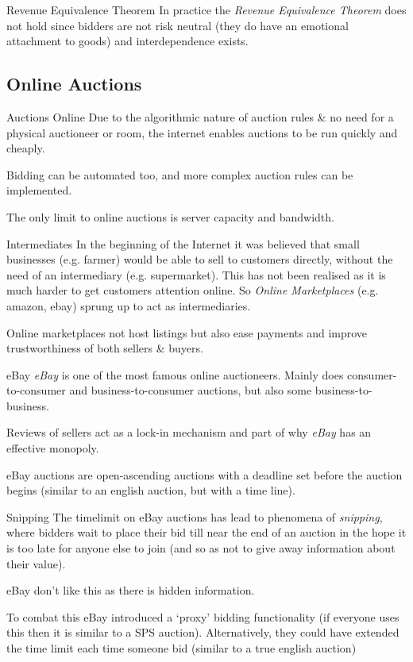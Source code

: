 \documentclass[11pt,a4paper]{article}
\begin{document}
\begin{remark}{Revenue Equivalence Theorem}
  In practice the \textit{Revenue Equivalence Theorem} does not hold since bidders are not risk neutral (they do have an emotional attachment to goods) and interdependence exists.
\end{remark}

\subsection{Online Auctions}

\begin{remark}{Auctions Online}
  Due to the algorithmic nature of auction rules \& no need for a physical auctioneer or room, the internet enables auctions to be run quickly and cheaply.
  \par Bidding can be automated too, and more complex auction rules can be implemented.
  \par The only limit to online auctions is server capacity and bandwidth.
\end{remark}

\begin{remark}{Intermediates}
  In the beginning of the Internet it was believed that small businesses (e.g. farmer) would be able to sell to customers directly, without the need of an intermediary (e.g. supermarket). This has not been realised as it is much harder to get customers attention online. So \textit{Online Marketplaces} (e.g. amazon, ebay) sprung up to act as intermediaries.
  \par Online marketplaces not host listings but also ease payments and improve trustworthiness of both sellers \& buyers.
\end{remark}

\begin{remark}{eBay}
  \textit{eBay} is one of the most famous online auctioneers. Mainly does consumer-to-consumer and business-to-consumer auctions, but also some business-to-business.
  \par Reviews of sellers act as a lock-in mechanism and part of why \textit{eBay} has an effective monopoly.
  \par eBay auctions are open-ascending auctions with a deadline set before the auction begins (similar to an english auction, but with a time line).
\end{remark}

\begin{remark}{Snipping}
  The timelimit on eBay auctions has lead to phenomena of \textit{snipping}, where bidders wait to place their bid till near the end of an auction in the hope it is too late for anyone else to join (and so as not to give away information about their value).
  \par eBay don't like this as there is hidden information.
  \par To combat this eBay introduced a `proxy' bidding functionality (if everyone uses this then it is similar to a SPS auction). Alternatively, they could have extended the time limit each time someone bid (similar to a true english auction)
\end{remark}
\end{document}
